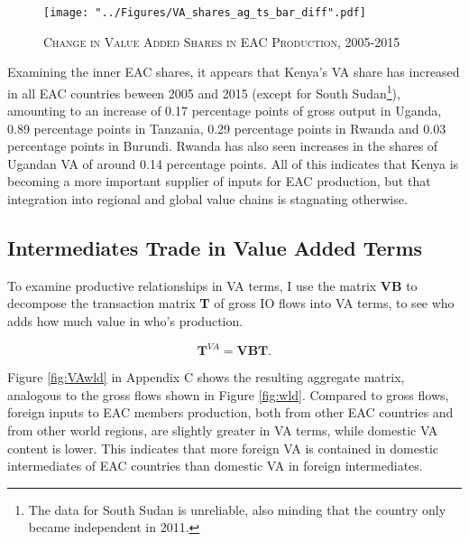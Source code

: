\documentclass[a4paper]{article}
\begin{document}
\begin{figure}[h!]
\centering
\caption{\label{fig:EACVB_ts_bar}\textsc{Change in Value Added Shares in EAC Production, 2005-2015}}
\texttt{[image: "../Figures/VA\_shares\_ag\_ts\_bar\_diff".pdf]} %
\vspace{-1.5cm}
\end{figure}
\FloatBarrier

Examining the inner EAC shares, it appears that %
Kenya's VA share has increased in all EAC countries beween 2005 and 2015 (except for South Sudan\footnote{The data for South Sudan is unreliable, also minding that the country only became independent in 2011.}), amounting to an increase of 0.17 percentage points of gross output in Uganda, 0.89 percentage points in Tanzania, 0.29 percentage points in Rwanda and 0.03 percentage points in Burundi. 
 Rwanda has also seen increases in the shares of Ugandan VA of around 0.14 percentage points. %
 All of this indicates that Kenya is becoming a more important supplier of inputs for EAC production, but that integration into regional and global value chains is stagnating otherwise. 


\subsection{Intermediates Trade in Value Added Terms}

To examine productive relationships in VA terms, I use the matrix \textbf{VB} to decompose the transaction matrix \textbf{T} of gross IO flows into VA terms, to see who adds how much value in who's production.  

\begin{equation}
\textbf{T}^{VA} = \textbf{VB} \textbf{T}.
\end{equation} 

Figure \ref{fig:VAwld} in Appendix C shows the resulting aggregate matrix, analogous to the gross flows shown in Figure \ref{fig:wld}. Compared to gross flows, foreign inputs to EAC members production, both from other EAC countries and from other world regions, are slightly greater in VA terms, while domestic VA content is lower. This indicates that more foreign VA is contained in domestic intermediates of EAC countries than domestic VA in foreign intermediates. \newline
\end{document}
